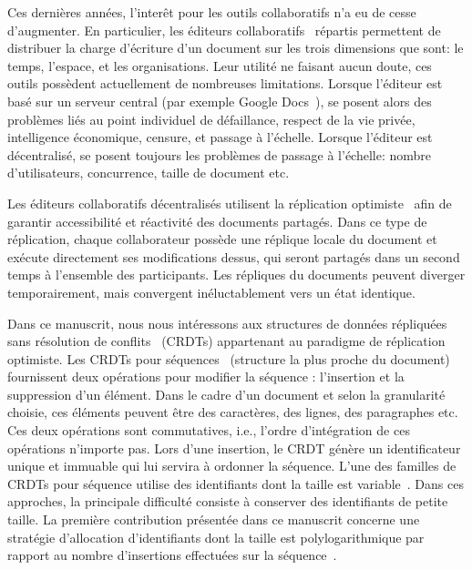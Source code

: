 
Ces dernières années, l'interêt pour les outils collaboratifs n'a eu de cesse
d'augmenter. En particulier, les éditeurs
collaboratifs~\cite{ellis1991groupware} répartis permettent de distribuer la
charge d'écriture d'un document sur les trois dimensions que sont: le temps,
l'espace, et les organisations. Leur utilité ne faisant aucun doute, ces outils
possèdent actuellement de nombreuses limitations. Lorsque l'éditeur est basé sur
un serveur central (par exemple Google Docs~\cite{nichols1995high}), se posent
alors des problèmes liés au point individuel de défaillance, respect de la vie
privée, intelligence économique, censure, et passage à l'échelle. Lorsque
l'éditeur est décentralisé, se posent toujours les problèmes de passage à
l'échelle: nombre d'utilisateurs, concurrence, taille de document etc.

Les éditeurs collaboratifs décentralisés utilisent la réplication
optimiste~\cite{saito2005optimistic} afin de garantir accessibilité et
réactivité des documents partagés. Dans ce type de réplication, chaque
collaborateur possède une réplique locale du document et exécute directement ses
modifications dessus, qui seront partagés dans un second temps à l'ensemble des
participants. Les répliques du documents peuvent diverger temporairement, mais
convergent inéluctablement vers un état identique.

Dans ce manuscrit, nous nous intéressons aux structures de données répliquées
sans résolution de conflits~\cite{shapiro2011comprehensive, shapiro2011conflict}
(CRDTs) appartenant au paradigme de réplication optimiste. Les CRDTs pour
séquences~\cite{ahmed2011evaluating, conway2014language, grishchenko2010deep,
  oster2006data, preguica2009commutative, roh2011replicated, weiss2007wooki,
  wu2010partial, Yu2012stringwise, andre2013supporting, weiss2009logoot}
(structure la plus proche du document) fournissent deux opérations pour modifier
la séquence : l'insertion et la suppression d'un élément. Dans le cadre d'un
document et selon la granularité choisie, ces éléments peuvent être des
caractères, des lignes, des paragraphes etc. Ces deux opérations sont
commutatives, i.e., l'ordre d'intégration de ces opérations n'importe pas. Lors
d'une insertion, le CRDT génère un identificateur unique et immuable qui lui
servira à ordonner la séquence. L'une des familles de CRDTs pour séquence
utilise des identifiants dont la taille est
variable~\cite{preguica2009commutative,
  andre2013supporting,weiss2009logoot}. Dans ces approches, la principale
difficulté consiste à conserver des identifiants de petite taille. La première
contribution présentée dans ce manuscrit concerne une stratégie d'allocation
d'identifiants dont la taille est polylogarithmique par rapport au nombre
d'insertions effectuées sur la séquence~\cite{nedelec2013lseq,
  nedelec2013concurrency}.

